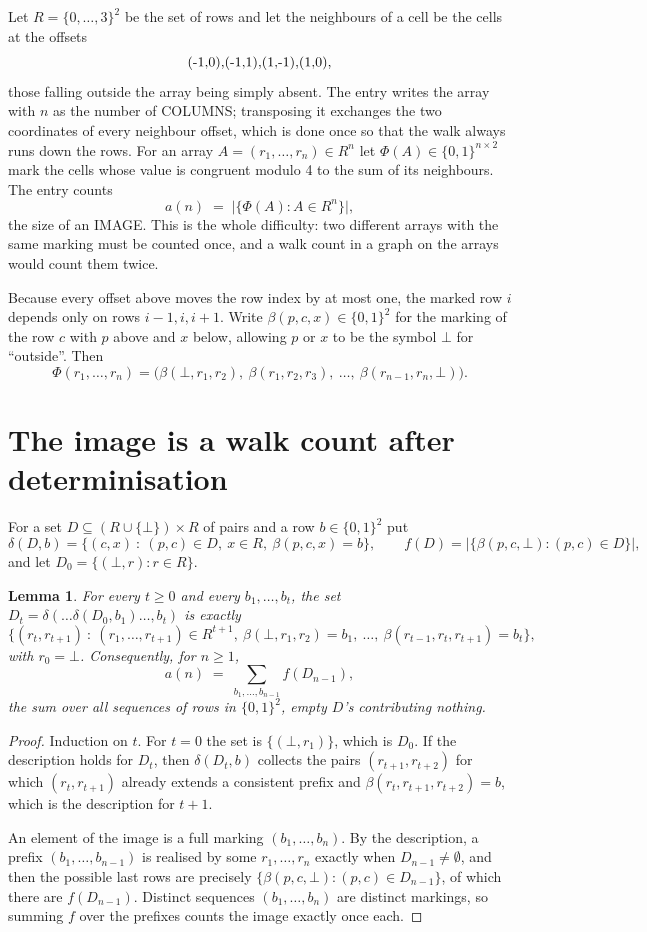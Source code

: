\documentclass[11pt,a4paper]{article}
\theoremstyle{plain}
\newtheorem{lemma}[theorem]{Lemma}
\theoremstyle{definition}
\begin{document}
Let $R=\{0,\dots,3\}^{2}$ be the set of rows and let the neighbours of a cell be the
cells at the offsets
\[
$(-1,0)$, $(-1,1)$, $(1,-1)$, $(1,0)$,
\]
those falling outside the array being simply absent. The entry writes the array with $n$ as the number of COLUMNS; transposing it exchanges the two coordinates of every neighbour offset, which is done once so that the walk always runs down the rows. For an array
$A=(r_1,\dots,r_n)\in R^n$ let $\Phi(A)\in\{0,1\}^{n\times2}$ mark the cells whose value
is congruent modulo 4 to the sum of its neighbours. The entry counts
\[
a(n)\;=\;\bigl|\{\Phi(A):A\in R^n\}\bigr| ,
\]
the size of an IMAGE. This is the whole difficulty: two different arrays with the same marking
must be counted once, and a walk count in a graph on the arrays would count them twice.

Because every offset above moves the row index by at most one, the marked row $i$ depends only
on rows $i-1,i,i+1$. Write $\beta(p,c,x)\in\{0,1\}^{2}$ for the marking of the row $c$
with $p$ above and $x$ below, allowing $p$ or $x$ to be the symbol $\bot$ for ``outside''.
Then
\[
\Phi(r_1,\dots,r_n)=\bigl(\beta(\bot,r_1,r_2),\ \beta(r_1,r_2,r_3),\ \dots,\
\beta(r_{n-1},r_n,\bot)\bigr).
\]

\section{The image is a walk count after determinisation}

For a set $D\subseteq(R\cup\{\bot\})\times R$ of pairs and a row $b\in\{0,1\}^{2}$ put
\[
\delta(D,b)=\{(c,x)\ :\ (p,c)\in D,\ x\in R,\ \beta(p,c,x)=b\},\qquad
f(D)=\bigl|\{\beta(p,c,\bot):(p,c)\in D\}\bigr| ,
\]
and let $D_0=\{(\bot,r):r\in R\}$.

\begin{lemma}\label{lem:det}
For every $t\ge0$ and every $b_1,\dots,b_t$, the set
$D_t=\delta(\dots\delta(D_0,b_1)\dots,b_t)$ is exactly
\[
\{(r_t,r_{t+1})\ :\ (r_1,\dots,r_{t+1})\in R^{t+1},\ \beta(\bot,r_1,r_2)=b_1,\ \dots,\
\beta(r_{t-1},r_t,r_{t+1})=b_t\} ,
\]
with $r_0=\bot$. Consequently, for $n\ge1$,
\[
a(n)\;=\;\sum_{b_1,\dots,b_{n-1}}f(D_{n-1}),
\]
the sum over all sequences of rows in $\{0,1\}^{2}$, empty $D$'s contributing nothing.
\end{lemma}

\begin{proof}
Induction on $t$. For $t=0$ the set is $\{(\bot,r_1)\}$, which is $D_0$. If the description
holds for $D_t$, then $\delta(D_t,b)$ collects the pairs $(r_{t+1},r_{t+2})$ for which
$(r_t,r_{t+1})$ already extends a consistent prefix and
$\beta(r_t,r_{t+1},r_{t+2})=b$, which is the description for $t+1$.

An element of the image is a full marking $(b_1,\dots,b_n)$. By the description, a prefix
$(b_1,\dots,b_{n-1})$ is realised by some $r_1,\dots,r_n$ exactly when $D_{n-1}\neq
\emptyset$, and then the possible last rows are precisely
$\{\beta(p,c,\bot):(p,c)\in D_{n-1}\}$, of which there are $f(D_{n-1})$. Distinct
sequences $(b_1,\dots,b_n)$ are distinct markings, so summing $f$ over the prefixes counts the
image exactly once each.
\end{proof}
\end{document}
